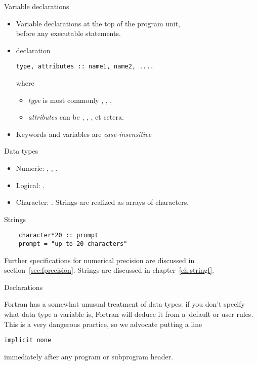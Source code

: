 \begin{slide}{Variable declarations}
  \label{sl:fvars}
  \begin{itemize}
  \item Variable declarations at the top of the program unit,\\
    before any executable statements.
  \item declaration
\begin{lstlisting}
type, attributes :: name1, name2, ....
\end{lstlisting}
where
\begin{itemize}
\item \textit{type} is most commonly , , ,
\item \textit{attributes} can be , ,
  ,  et cetera.
\end{itemize}
\item Keywords and variables are
  \emph{case-insensitive}
\end{itemize}
\end{slide}

\begin{block}{Data types}
  \label{sl:ftypes}
  \begin{itemize}
  \item Numeric: , ,
    . 
  \item Logical: .
  \item Character: . Strings are realized as
    arrays of characters.
  \end{itemize}  
\end{block}

\begin{slide}{Strings}
  \label{sl:fchar20}
  \begin{lstlisting}
    character*20 :: prompt
    prompt = "up to 20 characters"
  \end{lstlisting}
\end{slide}

Further specifications for numerical
    precision are discussed in section~\ref{sec:fprecision}.
Strings are discussed in chapter~\ref{ch:stringf}.

 {Declarations}
\label{sec:ftype}

Fortran has a somewhat unusual treatment of data types: if you don't
specify what data type a variable is, Fortran will deduce it from
a~default or user rules. This is a very dangerous practice, so we
advocate putting a line
\begin{lstlisting}
implicit none
\end{lstlisting}
immediately after any program or subprogram header.

